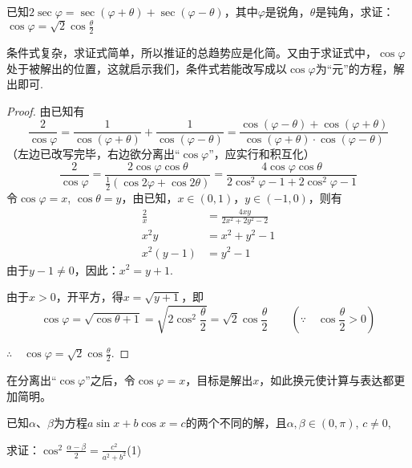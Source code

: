 \begin{example}
已知$2\sec\varphi=\sec(\varphi+\theta)+\sec(\varphi-\theta)$，其中$\varphi$是锐角，$\theta$是钝角，求证：$\cos\varphi=\sqrt{2}\cos\frac{\theta}{2}$
\end{example}

\begin{analyze}
条件式复杂，求证式简单，所以推证的总趋势应是化简。又由于求证式中，$\cos\varphi$处于被解出的位置，这就启示我们，条件式若能改写成以$\cos\varphi$为“元”的方程，解出即可.
\end{analyze}

\begin{proof}
    由已知有
\[\frac{2}{\cos\varphi}=\frac{1}{\cos(\varphi+\theta)}+\frac{1}{\cos(\varphi-\theta)}=\frac{\cos(\varphi-\theta)+\cos(\varphi+\theta)}{\cos(\varphi+\theta)\cdot \cos(\varphi-\theta)}\]
（左边已改写完毕，右边欲分离出“$\cos\varphi$”，应实行和积互化）
\[\frac{2}{\cos\varphi}=\frac{2\cos\varphi\cos\theta}{\frac{1}{2}(\cos2\varphi+\cos2\theta)}=\frac{4\cos\varphi\cos\theta}{2\cos^2\varphi-1+2\cos^2\varphi-1}\]
令$\cos\varphi=x$, $\cos\theta=y$，由已知，$x\in(0,1)$，$y\in(-1,0)$，则有
\[\begin{split}
    \frac{2}{x}&=\frac{4xy}{2x^2+2y^2-2}\\
    x^2y &=x^2+y^2-1\\
    x^2(y-1)&=y^2-1
\end{split}\]
由于$y-1\ne 0$，因此：$x^2=y+1$.

由于$x>0$，开平方，得$x=\sqrt{y+1}$，即
\[\cos\varphi=\sqrt{\cos\theta+1}=\sqrt{2\cos^2\frac{\theta}{2}}=\sqrt{2}\cos\frac{\theta}{2}\qquad \left(\because\quad \cos\frac{\theta}{2}>0\right)\]

$\therefore\quad \cos\varphi=\sqrt{2}\cos\frac{\theta}{2}$.
\end{proof}

\begin{remark}
在分离出“$\cos\varphi$”之后，令$\cos\varphi=x$，目标是解出$x$，如此换元使计算与表达都更加简明。
\end{remark}


\begin{example}
    已知$\alpha$、$\beta$为方程$a\sin x+b\cos x=c$的两个不同的解，且$\alpha,\beta\in (0,\pi)$, $c\ne 0$,

    求证：$\cos^2\frac{\alpha-\beta}{2}=\frac{c^2}{a^2+b^2}$\hfill(1)
\end{example}

